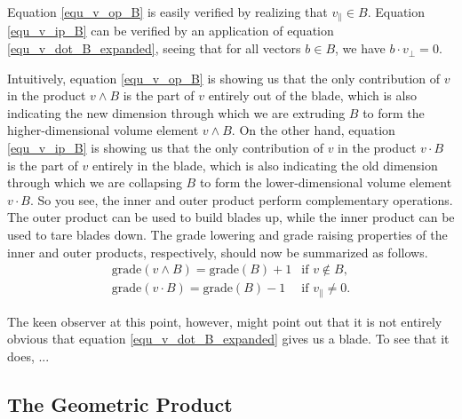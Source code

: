 \documentclass[12pt]{article}
\begin{document}
Equation \eqref{equ_v_op_B} is easily verified by realizing that $v_{\parallel}\in B$.
Equation \eqref{equ_v_ip_B} can be verified by an application of
equation \eqref{equ_v_dot_B_expanded}, seeing that for all
vectors $b\in B$, we have $b\cdot v_{\perp}=0$.

Intuitively, equation \eqref{equ_v_op_B} is showing us that
the only contribution of $v$ in the product $v\wedge B$
is the part of $v$ entirely out of the blade, which is also indicating
the new dimension through which we are extruding $B$ to
form the higher-dimensional volume element $v\wedge B$.
On the other hand, equation \eqref{equ_v_ip_B} is showing us
that the only contribution of $v$ in the product $v\cdot B$
is the part of $v$ entirely in the blade, which is also indicating
the old dimension through which we are collapsing $B$ to
form the lower-dimensional volume element $v\cdot B$.
So you see, the inner and outer product perform complementary
operations.  The outer product can be used to build blades up, while
the inner product can be used to tare blades down.
The grade lowering and grade raising properties of the inner
and outer products, respectively, should now be summarized
as follows.
\begin{equation}
\begin{array}{ll}
\mbox{grade}(v\wedge B) = \mbox{grade}(B)+1 & \mbox{if $v\not\in B$,} \\
\mbox{grade}(v\cdot B) = \mbox{grade}(B)-1 & \mbox{if $v_{\parallel}\neq 0$.}
\end{array}
\end{equation}

The keen observer at this point, however, might point
out that it is not entirely obvious that equation
\eqref{equ_v_dot_B_expanded} gives us a blade.  To see that
it does, ...




\subsection{The Geometric Product}







\end{document}
